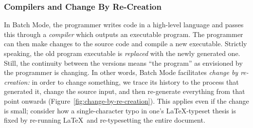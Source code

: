 \documentclass[ twoside,openright,titlepage,numbers=noenddot,headinclude,footinclude,cleardoublepage=empty,abstract=on,
                BCOR=5mm,paper=a4,fontsize=11pt
                ]{scrreprt}
\theoremstyle{definition}
\begin{document}
\hypertarget{compilers-and-change-by-re-creation}{\subsubsection{Compilers and Change By
Re-Creation}\label{compilers-and-change-by-re-creation}}

In Batch Mode, the programmer writes code in a high-level language and
passes this through a \emph{compiler} which outputs an executable
program. The programmer can then make changes to the source code and
compile a new executable. Strictly speaking, the old program executable
is \emph{replaced} with the newly generated one. Still, the continuity
between the versions means ``the program'' as envisioned by the
programmer is changing. In other words, Batch Mode facilitates
\emph{change by re-creation:} in order to change something, we trace its
history to the process that generated it, change the source input, and
then re-generate everything from that point onwards
(Figure~\ref{fig:change-by-re-creation}). This applies even if the
change is small; consider how a single-character typo in one's
\LaTeX-typeset thesis is fixed by re-running \LaTeX~and re-typesetting
the entire document.
\end{document}
